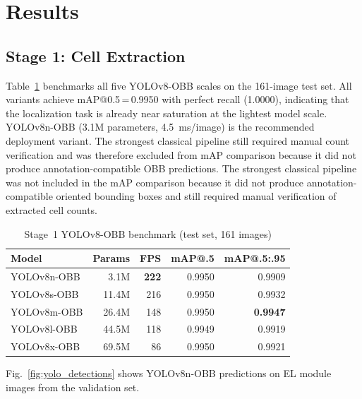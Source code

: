 \documentclass[conference]{IEEEtran}
\begin{document}
\section{Results}
\label{sec:results}

\subsection{Stage 1: Cell Extraction}

Table~\ref{tab:stage1_results} benchmarks all five YOLOv8-OBB scales on the 161-image test set. All variants achieve mAP@0.5\,=\,0.9950 with perfect recall (1.0000), indicating that the localization task is already near saturation at the lightest model scale. YOLOv8n-OBB (3.1M parameters, 4.5~ms/image) is the recommended deployment variant. The strongest classical pipeline still required manual count verification and was therefore excluded from mAP comparison because it did not produce annotation-compatible OBB predictions. The strongest classical pipeline was not included in the mAP comparison because it did not produce annotation-compatible oriented bounding boxes and still required manual verification of extracted cell counts.

\begin{table}[t]
  \caption{Stage~1 YOLOv8-OBB benchmark (test set, 161 images)}
  \label{tab:stage1_results}
  \begin{center}
  \renewcommand{\arraystretch}{1.05}\small
  \begin{tabular}{lrrrr}
    \toprule
    \textbf{Model} & \textbf{Params} & \textbf{FPS} & \textbf{mAP@.5} & \textbf{mAP@.5:.95}\\
    \midrule
    YOLOv8n-OBB & 3.1M  & \textbf{222} & 0.9950 & 0.9909\\
    YOLOv8s-OBB & 11.4M & 216          & 0.9950 & 0.9932\\
    YOLOv8m-OBB & 26.4M & 148          & 0.9950 & \textbf{0.9947}\\
    YOLOv8l-OBB & 44.5M & 118          & 0.9949 & 0.9919\\
    YOLOv8x-OBB & 69.5M & 86           & 0.9950 & 0.9921\\
    \midrule
  \end{tabular}
  \end{center}
\end{table}

Fig.~\ref{fig:yolo_detections} shows YOLOv8n-OBB predictions on EL module images from the validation set.
\end{document}
